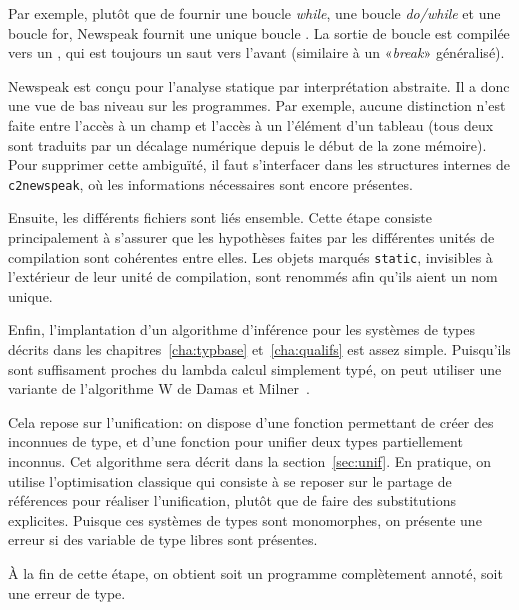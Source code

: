 Par exemple, plutôt que de fournir une boucle \emph{while}, une boucle
\emph{do/while} et une boucle for, Newspeak fournit une unique boucle
\npkWhile{}. La sortie de boucle est compilée vers un \npkGoto{}\cite{goto}, qui
est toujours un saut vers l'avant (similaire à un «\emph{break}» généralisé).

Newspeak est conçu pour l'analyse statique par interprétation abstraite. Il a
donc une vue de bas niveau sur les programmes. Par exemple, aucune distinction
n'est faite entre l'accès à un champ et l'accès à un l'élément d'un tableau
(tous deux sont traduits par un décalage numérique depuis le début de la zone
mémoire). Pour supprimer cette ambiguïté, il faut s'interfacer dans les
structures internes de \texttt{c2newspeak}, où les informations nécessaires sont
encore présentes.

Ensuite, les différents fichiers sont liés ensemble. Cette étape consiste
principalement à s'assurer que les hypothèses faites par les différentes unités
de compilation sont cohérentes entre elles. Les objets marqués \texttt{static},
invisibles à l'extérieur de leur unité de compilation, sont renommés afin qu'ils
aient un nom unique.

Enfin, l'implantation d'un algorithme d'inférence pour les systèmes de types
décrits dans les chapitres~\ref{cha:typbase} et~\ref{cha:qualifs} est assez
simple. Puisqu'ils sont suffisament proches du lambda calcul simplement typé, on
peut utiliser une variante de l'algorithme W de Damas et
Milner~\cite{DamasMilner}.

Cela repose sur l'unification: on dispose d'une fonction permettant de créer des
inconnues de type, et d'une fonction pour unifier deux types partiellement
inconnus. Cet algorithme sera décrit dans la section~\ref{sec:unif}. En
pratique, on utilise l'optimisation classique qui consiste à se
reposer sur le partage de références pour réaliser l'unification, plutôt que de
faire des substitutions explicites. Puisque ces systèmes de types sont
monomorphes, on présente une erreur si des variable de type libres sont
présentes.

À la fin de cette étape, on obtient soit un programme complètement annoté, soit
une erreur de type.




